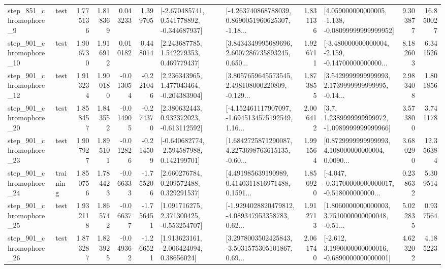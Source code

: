 \begin{tabular}{llrrrrllrlrr}
   step\_851\_chromophore\_9 &      test &      1.775136 &    1.818369 &      0.043233 &  1.399705 &   [-2.670485741, 0.541778892, -0.344687937] &  [-4.263740868788039, 0.8690051960625307, -1.18... &       1.831136 &  [4.059000000000005, -1.138, -0.08099999999999952] &            9.303877 &         16.850027 \\
  step\_901\_chromophore\_10 &      test &      1.906730 &    1.916912 &      0.010182 &  0.448014 &     [2.243687785, 1.542279353, 0.469779437] &  [3.8434349995089696, 2.6007286735893245, 0.650... &       1.926711 &  [-3.480000000000004, -2.159, -0.14700000000000... &            8.182603 &          6.341526 \\
  step\_901\_chromophore\_12 &      test &      1.913234 &    1.900180 &     -0.013054 & -0.221046 &    [2.236343965, 1.477043464, -0.204383904] &  [3.8057659645573545, 2.498108000220809, -0.129... &       1.873855 &  [3.5429999999999993, 2.1739999999999995, -0.14... &            2.983408 &          1.801856 \\
  step\_901\_chromophore\_20 &      test &      1.858457 &    1.843552 &     -0.014905 & -0.274370 &    [2.380632443, 0.932372023, -0.613112592] &  [-4.152461117907097, -1.6945134575192549, 1.16... &       2.006412 &     [3.7, 1.2389999999999972, -1.0989999999999966] &            3.573800 &          3.741178 \\
  step\_901\_chromophore\_23 &      test &      1.907927 &    1.895101 &     -0.012826 & -0.214509 &   [-0.640682774, -2.594587988, 0.142199701] &  [1.6842725871290087, 4.2273698763615135, -0.60... &       1.991564 &  [0.8729999999999993, 4.108000000000004, 0.0090... &            3.680290 &         12.356384 \\
  step\_901\_chromophore\_24 &  training &      1.850756 &    1.784423 &     -0.066333 & -1.755206 &     [2.660276784, 0.209572488, 0.329291537] &  [4.491985639190989, 0.4140311816971488, 0.1591... &       1.850920 &  [-4.047, -0.31700000000000017, -0.518000000000... &            0.238632 &          5.309514 \\
  step\_901\_chromophore\_25 &      test &      1.932118 &    1.865742 &     -0.066377 & -1.756451 &    [1.091716275, 2.371300425, -0.553254707] &  [-1.9294028820479812, -4.089347953358783, 0.62... &       1.912713 &  [1.8060000000000003, 3.7510000000000048, -0.51... &            5.022835 &          0.937564 \\
  step\_901\_chromophore\_26 &      test &      1.873287 &    1.823925 &     -0.049362 & -1.266521 &     [1.913623161, -2.006424094, 0.38656024] &  [3.2978003502425843, -3.5031575305101867, 0.69... &       2.061740 &  [-2.612, 3.1990000000000016, -0.6890000000000001] &            4.623202 &          4.185223 \\

\end{tabular}
